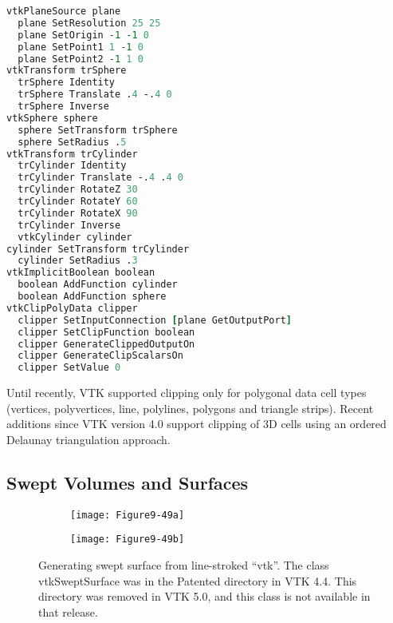 \begin{lstlisting}[language=TCL, caption={Clipping a plane with a sphere and ellipse.}]
vtkPlaneSource plane
  plane SetResolution 25 25
  plane SetOrigin -1 -1 0
  plane SetPoint1 1 -1 0
  plane SetPoint2 -1 1 0
vtkTransform trSphere
  trSphere Identity
  trSphere Translate .4 -.4 0
  trSphere Inverse
vtkSphere sphere
  sphere SetTransform trSphere
  sphere SetRadius .5
vtkTransform trCylinder
  trCylinder Identity
  trCylinder Translate -.4 .4 0
  trCylinder RotateZ 30
  trCylinder RotateY 60
  trCylinder RotateX 90
  trCylinder Inverse
  vtkCylinder cylinder
cylinder SetTransform trCylinder
  cylinder SetRadius .3
vtkImplicitBoolean boolean
  boolean AddFunction cylinder
  boolean AddFunction sphere
vtkClipPolyData clipper
  clipper SetInputConnection [plane GetOutputPort]
  clipper SetClipFunction boolean
  clipper GenerateClippedOutputOn
  clipper GenerateClipScalarsOn
  clipper SetValue 0
\end{lstlisting}

Until recently, VTK supported clipping only for polygonal data cell types (vertices, polyvertices, line, polylines, polygons and triangle strips). Recent additions since VTK version 4.0 support clipping of 3D cells using an ordered Delaunay triangulation approach.

\subsection{Swept Volumes and Surfaces}

\begin{figure}[htb]
    \centering
	\begin{subfigure}[h]{0.48\linewidth}
		\texttt{[image: Figure9-49a]}
		\captionsetup{justification=centering}
		\caption*{}
		\label{fig:Figure9-49a}
	\end{subfigure}
	\hfill
	\begin{subfigure}[h]{0.48\linewidth}
		\texttt{[image: Figure9-49b]}
		\captionsetup{justification=centering}
		\caption*{}
	\end{subfigure}
	\caption{Generating swept surface from line-stroked ``vtk''. The class vtkSweptSurface was in the Patented directory in VTK 4.4. This directory was removed in VTK 5.0, and this class is not available in that release.}\label{fig:Figure9-49}
\end{figure}

